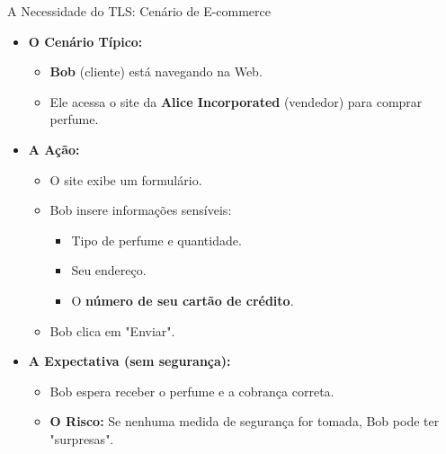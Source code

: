 \begin{frame}{A Necessidade do TLS: Cenário de E-commerce}
    \begin{itemize}
        \item \textbf{O Cenário Típico:}
              \begin{itemize}
                  \item \textbf{Bob} (cliente) está navegando na Web.
                  \item Ele acessa o site da \textbf{Alice Incorporated} (vendedor) para comprar perfume.
              \end{itemize}

        \item \textbf{A Ação:}
              \begin{itemize}
                  \item O site exibe um formulário.
                  \item Bob insere informações sensíveis:
                        \begin{itemize}
                            \item Tipo de perfume e quantidade.
                            \item Seu endereço.
                            \item O \textbf{número de seu cartão de crédito}.
                        \end{itemize}
                  \item Bob clica em "Enviar".
              \end{itemize}

        \item \textbf{A Expectativa (sem segurança):}
              \begin{itemize}
                  \item Bob espera receber o perfume e a cobrança correta.
                  \item \textbf{O Risco:} Se nenhuma medida de segurança for tomada, Bob pode ter "surpresas".
              \end{itemize}
    \end{itemize}
\end{frame}

